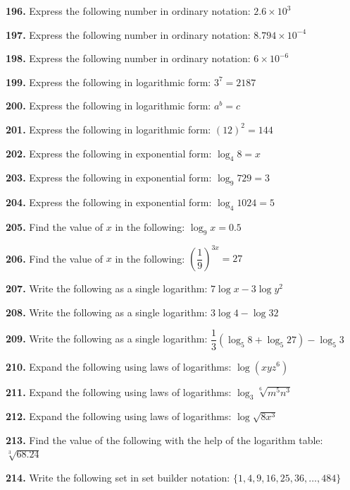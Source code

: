 \documentclass[11pt]{article}
\begin{document}
\bigskip
\noindent\textbf{196.} Express the following number in ordinary notation: $2.6\times10^{3}$

\bigskip
\noindent\textbf{197.} Express the following number in ordinary notation: $8.794\times10^{-4}$

\bigskip
\noindent\textbf{198.} Express the following number in ordinary notation: $6\times10^{-6}$

\bigskip
\noindent\textbf{199.} Express the following in logarithmic form: $3^7=2187$

\bigskip
\noindent\textbf{200.} Express the following in logarithmic form: $a^b=c$

\bigskip
\noindent\textbf{201.} Express the following in logarithmic form: $(12)^2=144$

\bigskip
\noindent\textbf{202.} Express the following in exponential form: $\log_4 8=x$

\bigskip
\noindent\textbf{203.} Express the following in exponential form: $\log_9 729=3$

\bigskip
\noindent\textbf{204.} Express the following in exponential form: $\log_4 1024=5$

\bigskip
\noindent\textbf{205.} Find the value of $x$ in the following: $\log_9 x=0.5$

\bigskip
\noindent\textbf{206.} Find the value of $x$ in the following: $\left(\dfrac{1}{9}\right)^{3x}=27$

\bigskip
\noindent\textbf{207.} Write the following as a single logarithm: $7\log x - 3\log y^2$

\bigskip
\noindent\textbf{208.} Write the following as a single logarithm: $3\log 4 - \log 32$

\bigskip
\noindent\textbf{209.} Write the following as a single logarithm: $\dfrac{1}{3}(\log_5 8 + \log_5 27) -\log_5 3$

\bigskip
\noindent\textbf{210.} Expand the following using laws of logarithms: $\log(xyz^6)$

\bigskip
\noindent\textbf{211.} Expand the following using laws of logarithms: $\log_3 \sqrt[6]{m^5n^3}$

\bigskip
\noindent\textbf{212.} Expand the following using laws of logarithms: $\log\sqrt{8x^3}$

\bigskip
\noindent\textbf{213.} Find the value of the following with the help of the logarithm table: $\sqrt[3]{68.24}$

\bigskip
\noindent\textbf{214.} Write the following set in set builder notation: $\{1,4,9,16,25,36,\ldots,484\}$
\end{document}
